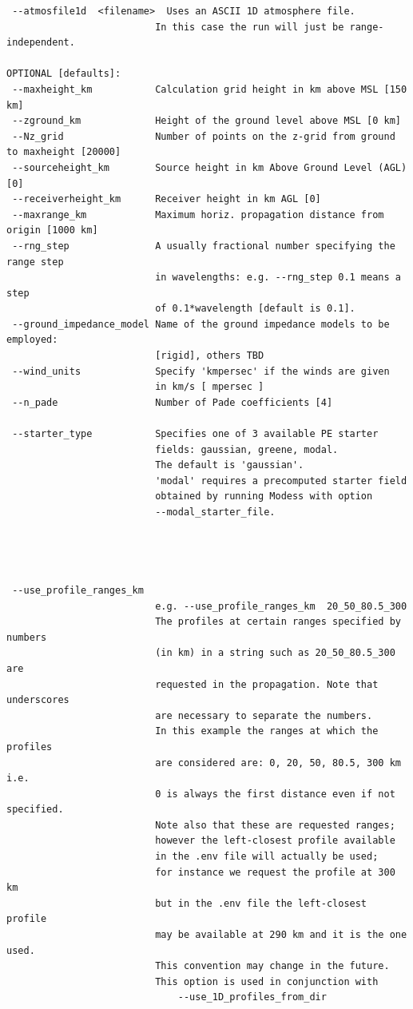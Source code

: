 \begin{verbatim}
 --atmosfile1d  <filename>  Uses an ASCII 1D atmosphere file.
                          In this case the run will just be range-independent.

OPTIONAL [defaults]:
 --maxheight_km           Calculation grid height in km above MSL [150 km]
 --zground_km             Height of the ground level above MSL [0 km]
 --Nz_grid                Number of points on the z-grid from ground to maxheight [20000]
 --sourceheight_km        Source height in km Above Ground Level (AGL) [0]
 --receiverheight_km      Receiver height in km AGL [0]
 --maxrange_km            Maximum horiz. propagation distance from origin [1000 km]
 --rng_step               A usually fractional number specifying the range step
                          in wavelengths: e.g. --rng_step 0.1 means a step
                          of 0.1*wavelength [default is 0.1].
 --ground_impedance_model Name of the ground impedance models to be employed:
                          [rigid], others TBD
 --wind_units             Specify 'kmpersec' if the winds are given
                          in km/s [ mpersec ]
 --n_pade                 Number of Pade coefficients [4]

 --starter_type           Specifies one of 3 available PE starter
                          fields: gaussian, greene, modal.
                          The default is 'gaussian'.
                          'modal' requires a precomputed starter field
                          obtained by running Modess with option
                          --modal_starter_file.




 --use_profile_ranges_km
                          e.g. --use_profile_ranges_km  20_50_80.5_300     
                          The profiles at certain ranges specified by numbers
                          (in km) in a string such as 20_50_80.5_300 are
                          requested in the propagation. Note that underscores
                          are necessary to separate the numbers.
                          In this example the ranges at which the profiles
                          are considered are: 0, 20, 50, 80.5, 300 km i.e.
                          0 is always the first distance even if not specified.
                          Note also that these are requested ranges;
                          however the left-closest profile available
                          in the .env file will actually be used; 
                          for instance we request the profile at 300 km 
                          but in the .env file the left-closest profile
                          may be available at 290 km and it is the one used.
                          This convention may change in the future.
                          This option is used in conjunction with
                              --use_1D_profiles_from_dir


\end{verbatim}
